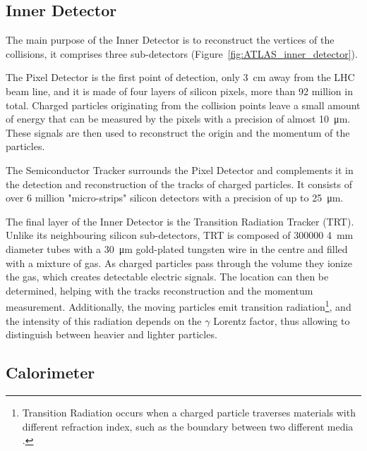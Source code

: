 \subsection{Inner Detector}\label{sec:ATLAS_inner_detector}
\marginpar{\flushleft }
The main purpose of the Inner Detector is to reconstruct the vertices of the collisions, it comprises three sub-detectors (Figure~\ref{fig:ATLAS_inner_detector}).

The Pixel Detector is the first point of detection, only \qty{3}{\centi\meter} away from the LHC beam line, and it is made of four layers of silicon pixels, more than 92 million in total. Charged particles originating from the collision points leave a small amount of energy that can be measured by the pixels with a precision of almost \qty{10}{\micro\meter}. These signals are then used to reconstruct the origin and the momentum of the particles.

The Semiconductor Tracker surrounds the Pixel Detector and complements it in the detection and reconstruction of the tracks of charged particles. It consists of over 6 million "micro-strips" silicon detectors with a precision of up to \qty{25}{\micro\meter}.

The final layer of the Inner Detector is the Transition Radiation Tracker (TRT). Unlike its neighbouring silicon sub-detectors, TRT is composed of \num{300000} \qty{4}{\milli\meter} diameter tubes with a \qty{30}{\micro\meter} gold-plated tungsten wire in the centre and filled with a mixture of gas. As charged particles pass through the volume they ionize the gas, which creates detectable electric signals. The location can then be determined, helping with the tracks reconstruction and the momentum measurement. Additionally, the moving particles emit transition radiation\footnote{Transition Radiation occurs when a charged particle traverses materials with different refraction index, such as the boundary between two different media \cite{wikipediaTransitionRadiation}.}, and the intensity of this radiation depends on the \(\gamma\) Lorentz factor, thus allowing to distinguish between heavier and lighter particles.


\subsection{Calorimeter}\label{sec:ATLAS_calorimeter}


